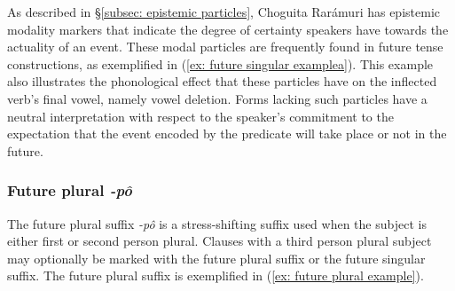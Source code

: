     \label{ex: future singular examplea}
        \label{ex: future singular exampleb}
    \z
\z

As described in §\ref{subsec: epistemic particles}, Choguita Rarámuri has epistemic modality markers that indicate the degree of certainty speakers have towards the actuality of an event. These modal particles are frequently found in future tense constructions, as exemplified in (\ref{ex: future singular examplea}). This example also illustrates the phonological effect that these particles have on the inflected verb’s final vowel, namely vowel deletion. Forms lacking such particles have a neutral interpretation with respect to the speaker’s commitment to the expectation that the event encoded by the predicate will take place or not in the future.

\subsubsection{Future plural \textit{-pô}}
\label{subsubsec: future plural}

The future plural suffix \textit{-pô} is a stress-shifting suffix used when the subject is either first or second person plural. Clauses with a third person plural subject may optionally be marked with the future plural suffix or the future singular suffix. The future plural suffix is exemplified in (\ref{ex: future plural example}).


